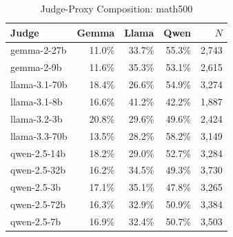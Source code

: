 \begin{table}[htbp]
\centering
\caption{Judge-Proxy Composition: math500}
\label{tab:composition_math500}
\begin{tabular}{lrrrr}
\toprule
Judge & Gemma & Llama & Qwen & $N$ \\
\midrule
gemma-2-27b & 11.0\% & 33.7\% & 55.3\% & 2,743 \\
gemma-2-9b & 11.6\% & 35.3\% & 53.1\% & 2,615 \\
llama-3.1-70b & 18.4\% & 26.6\% & 54.9\% & 3,274 \\
llama-3.1-8b & 16.6\% & 41.2\% & 42.2\% & 1,887 \\
llama-3.2-3b & 20.8\% & 29.6\% & 49.6\% & 2,424 \\
llama-3.3-70b & 13.5\% & 28.2\% & 58.2\% & 3,149 \\
qwen-2.5-14b & 18.2\% & 29.0\% & 52.7\% & 3,284 \\
qwen-2.5-32b & 16.2\% & 34.5\% & 49.3\% & 3,730 \\
qwen-2.5-3b & 17.1\% & 35.1\% & 47.8\% & 3,265 \\
qwen-2.5-72b & 16.3\% & 32.9\% & 50.9\% & 3,384 \\
qwen-2.5-7b & 16.9\% & 32.4\% & 50.7\% & 3,503 \\
\bottomrule
\end{tabular}
\end{table}